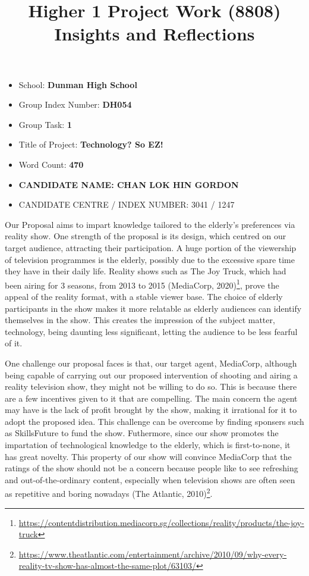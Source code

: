 \documentclass[a4paper,12pt]{article}
\date{}
\title{\bf Higher 1 Project Work (8808)\\
Insights and Reflections}
\begin{document}
\maketitle
\begin{center}
\begin{itemize}
    \item[] School: {\bf Dunman High School}
    \item[] Group Index Number: {\bf DH054}
    \item[] Group Task: {\bf 1}
    \item[] Title of Project: {\bf Technology? So EZ!}
    \item[] Word Count: {\bf 470}
    \item[] \bf CANDIDATE NAME: CHAN LOK HIN GORDON
    \item[] CANDIDATE CENTRE / INDEX NUMBER: 3041 / 1247
\end{itemize}
\end{center}
\newpage
Our Proposal aims to impart knowledge tailored to the elderly's preferences via reality show. One strength of the proposal is its design, which centred on our target audience, attracting their participation. A huge portion of the viewership of television programmes is the elderly, possibly due to the excessive spare time they have in their daily life. Reality shows such as The Joy Truck, which had been airing for 3 seasons, from 2013 to 2015 (MediaCorp, 2020)\footnote{\url{https://contentdistribution.mediacorp.sg/collections/reality/products/the-joy-truck}}, prove the appeal of the reality format, with a stable viewer base. The choice of elderly participants in the show makes it more relatable as elderly audiences can identify themselves in the show. This creates the impression of the subject matter, technology, being daunting less significant, letting the audience to be less fearful of it.\par
One challenge our proposal faces is that, our target agent, MediaCorp, although being capable of carrying out our proposed intervention of shooting and airing a reality television show, they might not be willing to do so. This is because there are a few incentives given to it that are compelling. The main concern the agent may have is the lack of profit brought by the show, making it irrational for it to adopt the proposed idea. This challenge can be overcome by finding sponsers such as SkillsFuture to fund the show. Futhermore, since our show promotes the impartation of technological knowledge to the elderly, which is first-to-none, it has great novelty. This property of our show will convince MediaCorp that the ratings of the show should not be a concern because people like to see refreshing and out-of-the-ordinary content, especially when television shows are often seen as repetitive and boring nowadays (The Atlantic, 2010)\footnote{\url{https://www.theatlantic.com/entertainment/archive/2010/09/why-every-reality-tv-show-has-almost-the-same-plot/63103/}}.\par
\end{document}
